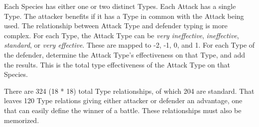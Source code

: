Each Species has either one or two distinct Types.
Each Attack has a single Type.
The attacker benefits if it has a Type in common with the Attack being used.
The relationship between Attack Type and defender typing is more complex.
For each Type, the Attack Type can be \textit{very ineffective},
 \textit{ineffective}, \textit{standard}, or \textit{very effective}.
These are mapped to -2, -1, 0, and 1.
For each Type of the defender, determine the Attack Type's effectiveness
 on that Type, and add the results.
This is the total type effectiveness of the Attack Type on that Species.

There are 324 (18 * 18) total Type relationships, of which 204 are standard.
That leaves 120 Type relations giving either attacker or defender an advantage,
 one that can easily define the winner of a battle.
These relationships must also be memorized.

